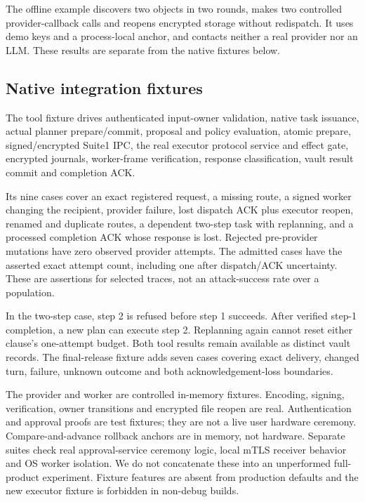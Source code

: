 \documentclass[letterpaper,twocolumn,10pt]{article}
\begin{document}
The offline example discovers two objects in two rounds, makes two controlled
provider-callback calls and reopens encrypted storage without redispatch.
It uses demo keys and a process-local anchor, and contacts neither a real
provider nor an LLM. These results are separate from the native fixtures below.

\subsection{Native integration fixtures}

The tool fixture drives authenticated input-owner validation, native task
issuance, actual planner prepare/commit, proposal and policy evaluation, atomic
prepare, signed/encrypted Suite1 IPC, the real executor protocol service and effect
gate, encrypted journals, worker-frame verification, response classification,
vault result commit and completion ACK.

Its nine cases cover an exact registered request, a missing route, a signed
worker changing the recipient, provider failure, lost dispatch ACK plus executor
reopen, renamed and duplicate routes, a dependent two-step task with replanning,
and a processed completion ACK whose response is lost.
Rejected pre-provider mutations have zero observed provider attempts.
The admitted cases have the asserted exact attempt count, including one after
dispatch/ACK uncertainty. These are assertions for selected traces, not an
attack-success rate over a population.

In the two-step case, step 2 is refused before step 1 succeeds. After verified
step-1 completion, a new plan can execute step 2. Replanning again cannot reset
either clause's one-attempt budget. Both tool results remain available as distinct
vault records. The final-release fixture adds seven cases covering exact delivery,
changed turn, failure, unknown outcome and both acknowledgement-loss boundaries.

The provider and worker are controlled in-memory fixtures. Encoding, signing,
verification, owner transitions and encrypted file reopen are real. Authentication
and approval proofs are test fixtures; they are not a live user hardware ceremony.
Compare-and-advance rollback anchors are in memory, not hardware. Separate suites
check real approval-service ceremony logic, local mTLS receiver behavior and
OS worker isolation. We do not concatenate these into an unperformed full-product
experiment. Fixture features are absent from production defaults and the new
executor fixture is forbidden in non-debug builds.
\end{document}
